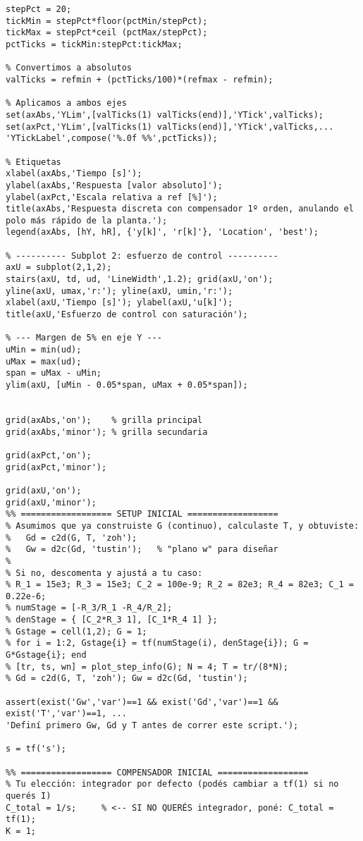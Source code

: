 \begin{lstlisting}[style=matlabstyle,caption={Hoja cálculos utilizada para el diseño de los compensadores.},label={matlab:hojaDeCalculos}]
% Redondeamos a múltiplos de 20 para ticks
stepPct = 20;
tickMin = stepPct*floor(pctMin/stepPct);
tickMax = stepPct*ceil (pctMax/stepPct);
pctTicks = tickMin:stepPct:tickMax;

% Convertimos a absolutos
valTicks = refmin + (pctTicks/100)*(refmax - refmin);

% Aplicamos a ambos ejes
set(axAbs,'YLim',[valTicks(1) valTicks(end)],'YTick',valTicks);
set(axPct,'YLim',[valTicks(1) valTicks(end)],'YTick',valTicks,...
'YTickLabel',compose('%.0f %%',pctTicks));

% Etiquetas
xlabel(axAbs,'Tiempo [s]');
ylabel(axAbs,'Respuesta [valor absoluto]');
ylabel(axPct,'Escala relativa a ref [%]');
title(axAbs,'Respuesta discreta con compensador 1º orden, anulando el polo más rápido de la planta.');
legend(axAbs, [hY, hR], {'y[k]', 'r[k]'}, 'Location', 'best');

% ---------- Subplot 2: esfuerzo de control ----------
axU = subplot(2,1,2);
stairs(axU, td, ud, 'LineWidth',1.2); grid(axU,'on');
yline(axU, umax,'r:'); yline(axU, umin,'r:');
xlabel(axU,'Tiempo [s]'); ylabel(axU,'u[k]');
title(axU,'Esfuerzo de control con saturación');

% --- Margen de 5% en eje Y ---
uMin = min(ud);
uMax = max(ud);
span = uMax - uMin;
ylim(axU, [uMin - 0.05*span, uMax + 0.05*span]);


grid(axAbs,'on');    % grilla principal
grid(axAbs,'minor'); % grilla secundaria

grid(axPct,'on');
grid(axPct,'minor');

grid(axU,'on');
grid(axU,'minor');
%% ================== SETUP INICIAL ==================
% Asumimos que ya construiste G (continuo), calculaste T, y obtuviste:
%   Gd = c2d(G, T, 'zoh');
%   Gw = d2c(Gd, 'tustin');   % "plano w" para diseñar
%
% Si no, descomenta y ajustá a tu caso:
% R_1 = 15e3; R_3 = 15e3; C_2 = 100e-9; R_2 = 82e3; R_4 = 82e3; C_1 = 0.22e-6;
% numStage = [-R_3/R_1 -R_4/R_2];
% denStage = { [C_2*R_3 1], [C_1*R_4 1] };
% Gstage = cell(1,2); G = 1;
% for i = 1:2, Gstage{i} = tf(numStage(i), denStage{i}); G = G*Gstage{i}; end
% [tr, ts, wn] = plot_step_info(G); N = 4; T = tr/(8*N);
% Gd = c2d(G, T, 'zoh'); Gw = d2c(Gd, 'tustin');

assert(exist('Gw','var')==1 && exist('Gd','var')==1 && exist('T','var')==1, ...
'Definí primero Gw, Gd y T antes de correr este script.');

s = tf('s');

%% ================== COMPENSADOR INICIAL ==================
% Tu elección: integrador por defecto (podés cambiar a tf(1) si no querés I)
C_total = 1/s;     % <-- SI NO QUERÉS integrador, poné: C_total = tf(1);
K = 1;


\end{lstlisting}
